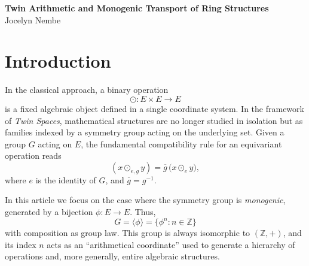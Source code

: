 \documentclass[11pt]{article}
\theoremstyle{definition}
\theoremstyle{remark}
\newcommand{\Z}{\mathbb{Z}}
\begin{document}
	
	\begin{center}
		{\LARGE \textbf{Twin Arithmetic and Monogenic Transport of Ring Structures}}\\[1em]
		{\large Jocelyn Nembe}
	\end{center}
	
	\vspace{1.5em}
	
	\begin{abstract}
		We develop a general theory of arithmetic hierarchies obtained by transporting
		the algebraic structure of a ring through the action of a monogenic group of
		applications.  
		Given a bijection $\phi:A\to A$ on a ring $(A,+,\cdot)$,
		the iterates $\phi^n$ induce a family of conjugate operations 
		$(\oplus_n,\otimes_n)$ forming a hierarchy of ``twin rings'',
		all isomorphic to the base ring.  
		This indexing by the additive group $(\Z,+)$ leads to a canonical theory of
		prime operations, factorization of operations, base-change identities,
		and arithmetical decompositions mirroring the classical decomposition of
		integers into prime factors.  
		The exponential case $\phi=\exp$ recovers ordinary addition and multiplication
		as two consecutive levels of the same structure, while higher levels
		produce non-linear arithmetic systems.  
		This article establishes the algebraic foundations of these twin hierarchies
		and prepares the study of growth laws, combinatorics, and higher-order
		arithmetics.
	\end{abstract}
	
	\section{Introduction}
	
	In the classical approach, a binary operation 
	\[
	\odot : E\times E \to E
	\]
	is a fixed algebraic object defined in a single coordinate system.
	In the framework of \emph{Twin Spaces}, mathematical structures are no longer
	studied in isolation but as families indexed by a symmetry group acting on
	the underlying set.  
	Given a group $G$ acting on $E$, the fundamental compatibility rule for an
	equivariant operation reads
	\[
	(x \odot_{e,g} y)
	= \overline{g}\,\bigl(x\odot_e y\bigr),
	\]
	where $e$ is the identity of $G$, and $\overline{g}=g^{-1}$.
	
	In this article we focus on the case where the symmetry group is 
	\emph{monogenic}, generated by a bijection $\phi:E\to E$.
	Thus,
	\[
	G = \langle \phi\rangle = \{\phi^n : n\in\Z\}
	\]
	with composition as group law.  
	This group is always isomorphic to $(\Z,+)$, and its index $n$ acts as an
	``arithmetical coordinate'' used to generate a hierarchy of operations
	and, more generally, entire algebraic structures.
	
\end{document}
